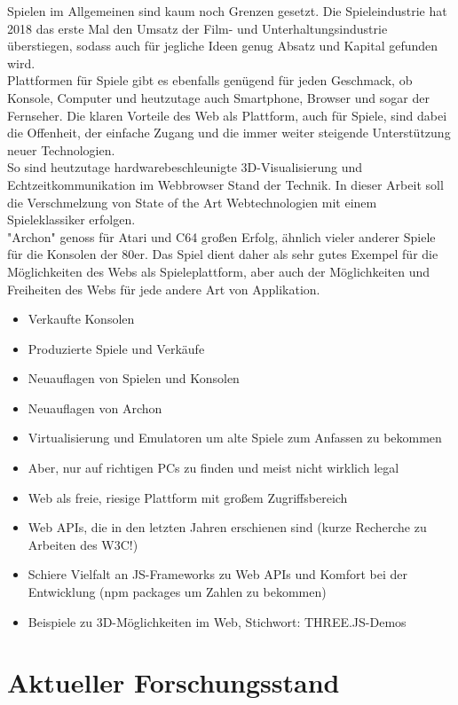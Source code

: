 Spielen im Allgemeinen sind kaum noch Grenzen gesetzt. Die Spieleindustrie hat 2018 das erste Mal den Umsatz der Film- und Unterhaltungsindustrie überstiegen, sodass auch für jegliche Ideen genug Absatz und Kapital gefunden wird.\\
Plattformen für Spiele gibt es ebenfalls genügend für jeden Geschmack, ob Konsole, Computer und heutzutage auch Smartphone, Browser und sogar der Fernseher.
Die klaren Vorteile des Web als Plattform, auch für Spiele, sind dabei die Offenheit, der einfache Zugang und die immer weiter steigende Unterstützung neuer Technologien.\\
So sind heutzutage hardwarebeschleunigte 3D-Visualisierung und Echtzeitkommunikation im Webbrowser Stand der Technik.
In dieser Arbeit soll die Verschmelzung von State of the Art Webtechnologien mit einem Spieleklassiker erfolgen.\\
"Archon" genoss für Atari und C64 großen Erfolg, ähnlich vieler anderer Spiele für die Konsolen der 80er.
Das Spiel dient daher als sehr gutes Exempel für die Möglichkeiten des Webs als Spieleplattform, aber auch der Möglichkeiten und Freiheiten des Webs für jede andere Art von Applikation.
\begin{itemize}
	\item Verkaufte Konsolen
	\item Produzierte Spiele und Verkäufe
	\item Neuauflagen von Spielen und Konsolen
	\item Neuauflagen von Archon 
	\item Virtualisierung und Emulatoren um alte Spiele zum Anfassen zu bekommen
	\item Aber, nur auf richtigen PCs zu finden und meist nicht wirklich legal
	\item Web als freie, riesige Plattform mit großem Zugriffsbereich
	\item Web APIs, die in den letzten Jahren erschienen sind (kurze Recherche zu Arbeiten des W3C!)
	\item Schiere Vielfalt an JS-Frameworks zu Web APIs und Komfort bei der Entwicklung (npm packages um Zahlen zu bekommen)
	\item Beispiele zu 3D-Möglichkeiten im Web, Stichwort: THREE.JS-Demos
\end{itemize}

\section{Aktueller Forschungsstand}
\label{sec:aktueller_forschungsstand}

